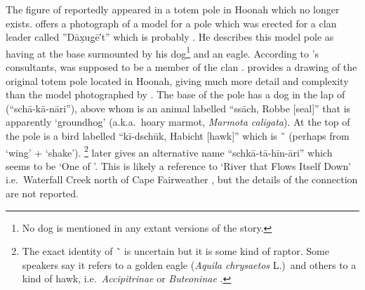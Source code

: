 The figure of  reportedly appeared in a totem pole in Hoonah which no longer exists.
\citeauthor{swanton:1908} offers a photograph of a model for a pole which was erected for a  clan leader called ”Dāx̣ug̣ē′t” which is probably  \parencite[431 fig.\ 109]{swanton:1908}.
He describes this model pole as having  at the base surmounted by his dog\footnote{No dog is mentioned in any extant versions of the  story.} and an eagle.
According to \citeauthor{swanton:1908}’s consultants,  was supposed to be a member of the  clan \parencite[432]{swanton:1908}.
\citeauthor{krause:1885} provides a drawing of the original totem pole located in Hoonah, giving much more detail and complexity than the model photographed by \citeauthor{swanton:1909} \parencites[132]{krause:1885}[94]{krause:1956}.
The base of the pole has a dog in the lap of  (“schā-kā-nāri”), above whom is an animal labelled “ssāch, Robbe [seal]” that is apparently  ‘groundhog’ (a.k.a.\ hoary marmot, \textit{Marmota caligata}).
At the top of the pole is a bird labelled “kī-dschūk, Habicht [hawk]” which is  \~\  (perhaps from  ‘wing’ +  ‘shake’).%
\footnote{The exact identity of  \~\  is uncertain but it is some kind of raptor.
Some speakers say it refers to a golden eagle (\textit{Aquila chrysaetos} L.)\ and others to a kind of hawk, i.e.\ \textit{Accipitrinae} or \textit{Buteoninae} \parencites[127]{boas:1917}[257]{krause:1956}[44]{olson:1967}[47]{de-laguna:1972}[28]{naish-story:1976}[33, 255, 441–442, 458]{emmons:1991}[\textsc{m}·137]{leer:2001}.}
\citeauthor{krause:1885} later gives  an alternative name “schkā-tā-hīn-āri” \parencites[380]{krause:1885}[251]{krause:1956} which seems to be  ‘One of ’.
This is likely a reference to  ‘River that Flows Itself Down’ i.e.\ Waterfall Creek north of Cape Fairweather \parencite[25 \#289, 40 \#31]{thornton:2012}, but the details of the connection are not reported.

